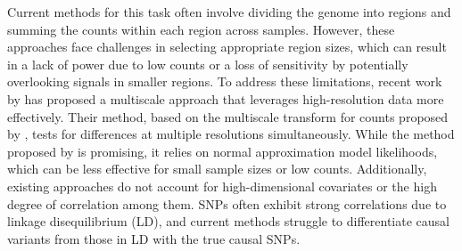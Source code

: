 Current methods for this task often involve dividing the genome into regions and summing the counts within each region across samples. However, these approaches face challenges in selecting appropriate region sizes, which can result in a lack of power due to low counts or a loss of sensitivity by potentially overlooking signals in smaller regions. To address these limitations, recent work by \cite{shim_multi-scale_2021} has proposed a multiscale approach that leverages high-resolution data more effectively. Their method, based on the multiscale transform for counts proposed by \cite{kolaczyk_bayesian_1999}, tests for differences at multiple resolutions simultaneously. While the method proposed by \cite{shim_multi-scale_2021} is promising, it relies on normal approximation model likelihoods, which can be less effective for small sample sizes or low counts. Additionally, existing approaches do not account for high-dimensional covariates or the high degree of correlation among them. SNPs often exhibit strong correlations due to linkage disequilibrium (LD), and current methods struggle to differentiate causal variants from those in LD with the true causal SNPs.

